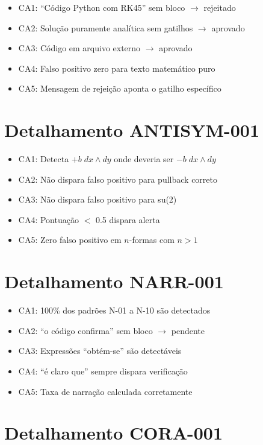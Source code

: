 \documentclass[12pt,a4paper,sumario=tradicional]{abntex2}
\begin{document}
\begin{apendicesenv}
\begin{itemize}
    \item [+] CA1: ``Código Python com RK45'' sem bloco $\to$ rejeitado
    \item [+] CA2: Solução puramente analítica sem gatilhos $\to$ aprovado
    \item [+] CA3: Código em arquivo externo $\to$ aprovado
    \item [+] CA4: Falso positivo zero para texto matemático puro
    \item [+] CA5: Mensagem de rejeição aponta o gatilho específico
\end{itemize}

\section{Detalhamento ANTISYM-001}

\begin{itemize}
    \item [+] CA1: Detecta $+b\;dx\wedge dy$ onde deveria ser $-b\;dx\wedge dy$
    \item [+] CA2: Não dispara falso positivo para pullback correto
    \item [+] CA3: Não dispara falso positivo para su(2)
    \item [+] CA4: Pontuação $<$ 0.5 dispara alerta
    \item [+] CA5: Zero falso positivo em $n$-formas com $n>1$
\end{itemize}

\section{Detalhamento NARR-001}

\begin{itemize}
    \item [+] CA1: 100\% dos padrões N-01 a N-10 são detectados
    \item [+] CA2: ``o código confirma'' sem bloco $\to$ pendente
    \item [+] CA3: Expressões ``obtém-se'' são detectáveis
    \item [+] CA4: ``é claro que'' sempre dispara verificação
    \item [+] CA5: Taxa de narração calculada corretamente
\end{itemize}

\section{Detalhamento CORA-001}


\end{apendicesenv}
\end{document}
